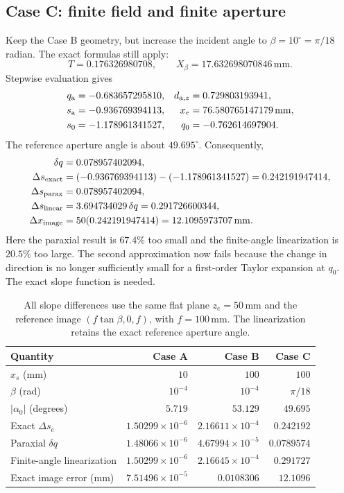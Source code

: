 \documentclass[11pt,a4paper]{article}
\numberwithin{equation}{section}
\newcommand{\mm}{\,\mathrm{mm}}
\begin{document}
\subsection{Case C: finite field and finite aperture}
Keep the Case B geometry, but increase the incident angle to
$\beta=10^\circ=\pi/18$ radian. The exact formulas still apply:
\[
 T=0.176326980708,\qquad X_\beta=17.632698070846\mm.
\]
Stepwise evaluation gives
\begin{align*}
 q_{\rm a}&=-0.683657295810,
 &d_{{\rm a},z}&=0.729803193941,\\
 s_{\rm a}&=-0.936769394113,
 &x_e&=76.580765147179\mm,\\
 s_0&=-1.178961341527,
 &q_0&=-0.762614697904.
\end{align*}
The reference aperture angle is about $49.695^\circ$.
Consequently,
\begin{align*}
 \delta q&=0.078957402094,\\
 \Delta s_{\rm exact}
 &=(-0.936769394113)-(-1.178961341527)
   =0.242191947414,\\
 \Delta s_{\rm parax}&=0.078957402094,\\
 \Delta s_{\rm linear}
 &=3.694734029\,\delta q=0.291726600344,\\
 \Delta x_{\rm image}
 &=50(0.242191947414)=12.1095973707\mm.
\end{align*}
Here the paraxial result is $67.4\%$ too small and the finite-angle
linearization is $20.5\%$ too large. The second approximation now fails
because the change in direction is no longer sufficiently small for a
first-order Taylor expansion at $q_0$.
The exact slope function is needed.

\begin{table}[htbp]
\centering
\small
\setlength{\tabcolsep}{4.5pt}
\begin{tabular}{@{}lrrr@{}}
\toprule
Quantity & Case A & Case B & Case C\\
\midrule
$x_s$ (mm) & $10$ & $100$ & $100$\\
$\beta$ (rad) & $10^{-4}$ & $10^{-4}$ & $\pi/18$\\
$|\alpha_0|$ (degrees) & $5.719$ & $53.129$ & $49.695$\\
Exact $\Delta s_e$ & $1.50299\times10^{-6}$ & $2.16611\times10^{-4}$ & $0.242192$\\
Paraxial $\delta q$ & $1.48066\times10^{-6}$ & $4.67994\times10^{-5}$ & $0.0789574$\\
Finite-angle linearization & $1.50299\times10^{-6}$ & $2.16645\times10^{-4}$ & $0.291727$\\
Exact image error (mm) & $7.51496\times10^{-5}$ & $0.0108306$ & $12.1096$\\
\bottomrule
\end{tabular}
\caption{All slope differences use the same flat plane $z_e=50\mm$ and
the reference image $(f\tan\beta,0,f)$, with $f=100\mm$.
The linearization retains the exact reference aperture angle.}
\end{table}
\end{document}
